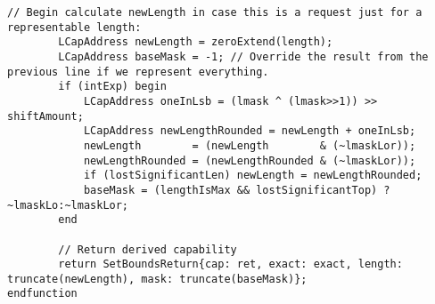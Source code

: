 \begin{lstlisting}[language=bluespec]
        // Begin calculate newLength in case this is a request just for a representable length:
        LCapAddress newLength = zeroExtend(length);
        LCapAddress baseMask = -1; // Override the result from the previous line if we represent everything.
        if (intExp) begin
            LCapAddress oneInLsb = (lmask ^ (lmask>>1)) >> shiftAmount;
            LCapAddress newLengthRounded = newLength + oneInLsb;
            newLength        = (newLength        & (~lmaskLor));
            newLengthRounded = (newLengthRounded & (~lmaskLor));
            if (lostSignificantLen) newLength = newLengthRounded;
            baseMask = (lengthIsMax && lostSignificantTop) ? ~lmaskLo:~lmaskLor;
        end

        // Return derived capability
        return SetBoundsReturn{cap: ret, exact: exact, length: truncate(newLength), mask: truncate(baseMask)};
endfunction
\end{lstlisting}
